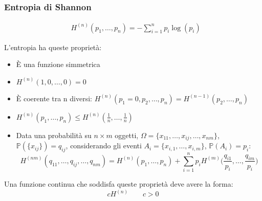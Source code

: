 \subsubsection{Entropia di Shannon}
\begin{align}
	& H^{(n)}(p_1, \ldots, p_n) = - \sum_{i=1}^{n} p_i \log(p_i) \tag{Entropia}
\end{align}
\begin{proposition}
	L'entropia ha queste proprietà:
	\begin{itemize}
		\item È una funzione simmetrica
		\item $H^{(n)}(1, 0, \ldots, 0) = 0$
		\item È coerente tra n diversi: $H^{(n)}(p_1=0,p_2, \ldots, p_n) = H^{(n-1)}(p_2, \ldots, p_n) $
		\item $H^{(n)}(p_1, \ldots, p_n) \leq H^{(n)}(\frac{1}{n}, \ldots, \frac{1}{n})$
		\item Data una probabilità su $n \times m$ oggetti, $\Omega = \{x_{11}, \ldots, x_{ij}, \ldots, x_{nm}\}$, $\mathbb{P}(\{x_{ij}\})=q_{ij}$, considerando gli eventi $A_i = \{x_{i,1}, \ldots, x_{i,m}\}$, $\mathbb{P}(A_i)=p_i$:
		\begin{equation}
			H^{(nm)}(q_{11}, \ldots, q_{ij}, \ldots, q_{nm}) = H^{(n)}(p_1, \ldots, p_n) + \sum_{i=1}^{n} p_i H^{(m)}\bigg(\frac{q_{i1}}{p_i}, \ldots, \frac{q_{im}}{p_i}\bigg)
		\end{equation}
	\end{itemize}
\end{proposition}

\begin{theorem}
	Una funzione continua che soddisfa queste proprietà deve avere la forma:
	\begin{equation}
		cH^{(n)} \quad\quad c>0
	\end{equation}
\end{theorem}

